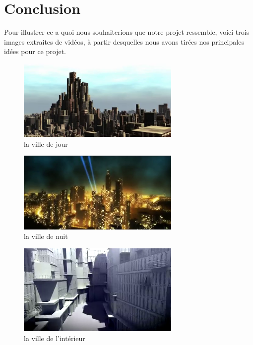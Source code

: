 \documentclass[a4paper,12pt]{article}
\begin{document}
\section*{Conclusion}

Pour illustrer ce a quoi nous souhaiterions que notre projet ressemble, voici trois images extraites de vidéos, à partir desquelles nous avons tirées nos principales idées pour ce projet.
\begin{figure}[h!]
  \centering

\includegraphics[width=0.7\textwidth]{images/shot0003.png}
  \caption{la ville de jour}
  \label{fig:villes1}
\end{figure}
\begin{figure}[h!]
  \centering

\includegraphics[width=0.7\textwidth]{images/shot0005.png}
  \caption{la ville de nuit}
  \label{fig:villes2}
\end{figure}
\begin{figure}[h!]
  \centering

\includegraphics[width=0.7\textwidth]{images/shot0006.png}
  \caption{la ville de l'intérieur}
  \label{fig:villes3}
\end{figure}
\end{document}
